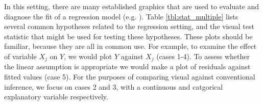 \documentclass{article}
\begin{document}
In this setting, there are many established graphics that are used to evaluate and diagnose the fit of a regression model (e.g. \citet{cook:99}). Table \ref{tbl:stat_multiple} lists several common hypotheses related to the regression setting, and the visual test statistic that might be used for testing these hypotheses. These plots should be familiar, because they are all in common use. For example, to examine the effect of variable $X_j$ on $Y$, we would plot $Y$ against $X_j$ (cases 1-4). To assess whether the linear assumption is appropriate we would make a plot of residuals against fitted values (case 5). For the purposes of comparing visual against conventional inference, we focus on cases 2 and 3, with a continuous and catgorical explanatory variable respectively. 

\end{document}
